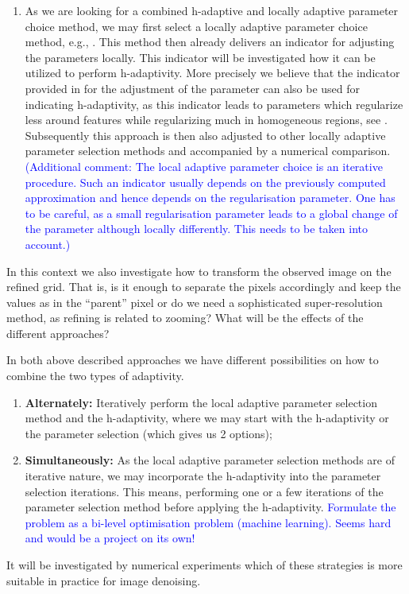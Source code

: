 \documentclass[enabledeprecatedfontcommands,cleardoublepage=empty,headsepline,twoside,11pt,DIV=15,BCOR=12mm,final]{scrartcl}
\begin{document}
\begin{enumerate}
\vspace{-0.5cm}
\item As we are looking for a combined h-adaptive and locally adaptive parameter choice method, we may first select a locally adaptive parameter choice method, e.g., \cite{DonHinRin}. This method then already delivers an indicator for adjusting the parameters locally. This indicator will be investigated how it can be utilized to perform h-adaptivity. More precisely we believe that the indicator provided in \cite{DonHinRin} for the adjustment of the parameter can also be used for indicating h-adaptivity, as this indicator leads to parameters which regularize less around features while regularizing much in homogeneous regions, see \cite{DonHinRin}. Subsequently this approach is then also adjusted to other locally adaptive parameter selection methods and accompanied by a numerical comparison.\\
\textcolor{blue}{(Additional comment: The local adaptive parameter choice is an iterative procedure. Such an indicator usually depends on the previously computed approximation and hence depends on the regularisation parameter. One has to be careful, as a small regularisation parameter leads to a global change of the parameter although locally differently. This needs to be taken into account.)}
\end{enumerate}  

In this context we also investigate how to transform the observed image on the refined grid. That is, is it enough to separate the pixels accordingly and keep the values as in the ``parent'' pixel or do we need a sophisticated super-resolution method, as refining is related to zooming? What will be the effects of the different approaches?

In both above described approaches we have different possibilities on how to combine the two types of adaptivity. 
\begin{enumerate}
\item \textbf{Alternately:} Iteratively perform the local adaptive parameter selection method  and the h-adaptivity, where we may start with the h-adaptivity or the parameter selection (which gives us 2 options);
\item \textbf{Simultaneously:} As the local adaptive parameter selection methods are of iterative nature, we may incorporate the h-adaptivity into the parameter selection iterations. This means, performing one or a few iterations of the parameter selection method before applying the h-adaptivity.  \textcolor{blue}{Formulate the problem as a bi-level optimisation problem (machine learning). Seems hard and would be a project on its own!}
\end{enumerate}
It will be investigated by numerical experiments which of these strategies is more suitable in practice for image denoising.
\end{document}
